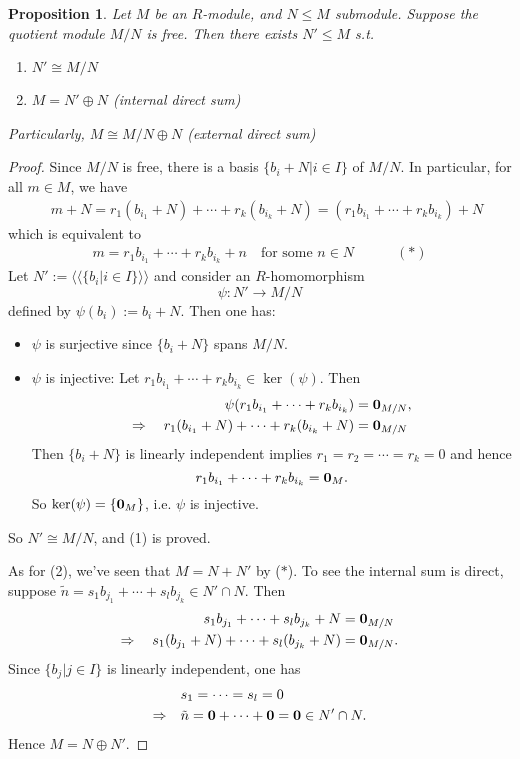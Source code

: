 \documentclass[11pt,openany]{book}
\theoremstyle{plain}
\newtheorem{proposition}[proposition]{Proposition}
\theoremstyle{definition}
\theoremstyle{remark}
\begin{document}
\begin{proposition}
    Let $M$ be an $R$-module, and $N\leq M$ submodule. Suppose the quotient module $M/N$ is free. Then there exists $N'\leq M$ s.t.
    \begin{enumerate}
        \item $N'\cong M/N$
        \item $M=N'\oplus N$ (internal direct sum)
    \end{enumerate}
    Particularly, $M\cong M/N\oplus N$ (external direct sum)
\end{proposition}
\begin{proof}
    Since $M/N$ is free, there is a basis $\{b_i+N|i\in I\}$ of $M/N$. In particular, for all $m\in M$, we have
    \begin{align*}
        \quad m+N = r_1(b_{i_1}+N)+\cdots+r_k(b_{i_k}+N) =(r_1b_{i_1}+\cdots+r_kb_{i_k})+N\end{align*}
    which is equivalent to 
     \begin{align*}
     m = r_1b_{i_1}+\cdots+r_kb_{i_k}+n \quad\text{for some $n\in N$} \quad \quad \quad (\ast)
    \end{align*}
    Let $N':=\langle\langle\{b_i|i\in I\}\rangle\rangle$ and consider an $R$-homomorphism
    $$\psi: N'\rightarrow M/N$$
    defined by $\psi(b_i) := b_i+N$. Then one has:
    \begin{itemize}
        \item $\psi$ is surjective since $\{b_i+N\}$ spans $M/N$.
        \item $\psi$ is injective: Let $r_1b_{i_1}+\cdots+r_kb_{i_k} \in \ker(\psi)$. Then
        \begin{align*}
        \psi(r_1b_{i_1}+\cdots+r_kb_{i_k}) &= {\bf 0}_{M/N},\\
        \Rightarrow \quad r_1(b_{i_1}+N)+\cdots+r_k(b_{i_k}+N) &= {\bf 0}_{M/N}
        \end{align*}
        Then $\{b_i+N\}$ is linearly independent implies $r_1=r_2=\cdots=r_k= 0$
and hence 
$$r_1b_{i_1}+\cdots+r_kb_{i_k} = {\bf 0}_M.$$
        So $\mathrm{ker}(\psi) = \{{\bf 0}_M\}$, i.e. $\psi$ is injective.
    \end{itemize}
So $N' \cong M/N$, and (1) is proved.

\medskip
    As for (2), we've seen that $M=N+N'$ by ($\ast$). To see the internal sum is direct, suppose $\tilde{n}= s_1b_{j_1}+\cdots+s_lb_{j_k}\in N'\cap N$. Then
    \begin{align*}
        \quad s_1b_{j_1}+\cdots+s_lb_{j_k}+N&={\bf 0}_{M/N}\\
        \Rightarrow \quad s_1(b_{j_1}+N)+\cdots+s_l(b_{j_{k}}+N) &= {\bf 0}_{M/N}.
    \end{align*}
    Since $\{b_j|j\in I\}$ is linearly independent, one has
    \begin{align*}
        &\quad s_1=\cdots= s_l=0\\
        \Rightarrow &\quad \tilde{n}={\bf 0}+\cdots+{\bf 0}={\bf 0}\in N'\cap N.
    \end{align*}
    Hence $M=N\oplus N'$.        
\end{proof}
\end{document}
